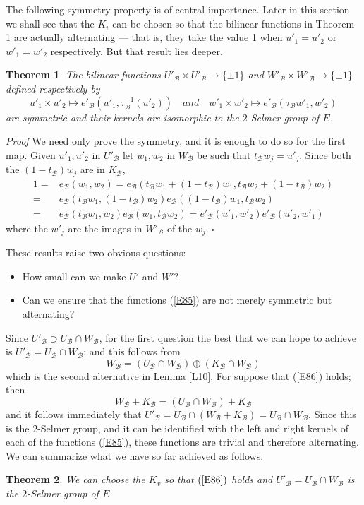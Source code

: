 \documentclass[12pt]{article}
\def\sB{{\mathcal B}}
\def\qed{{\hfill$\square$}}
\def\beq{\begin{equation} \label}
\def\bth{\begin{theorem} \label}
\def\eth{\end{theorem}}
\newtheorem{theorem}{Theorem}
\begin{document}
The following symmetry property is of central importance.
Later in this section we shall see that the $K_i$ can be
chosen so that the bilinear functions in Theorem \ref{T6} are
actually alternating --- that is, they take the value 1
when $u'_1=u'_2$ or $w'_1=w'_2$ respectively. But that result
lies deeper.
\bth{T6} The bilinear functions $U'_\sB\times U'_\sB\rightarrow\{\pm1\}$ and
$W'_\sB\times W'_\sB\rightarrow\{\pm1\}$ defined respectively by
\beq{E85} u'_1\times u'_2\mapsto e'_\sB(u'_1,
\tau^{-1}_\sB(u'_2)) \quad
{\mathit{and}} \quad w'_1\times w'_2\mapsto
e'_\sB(\tau_\sB w'_1,w'_2) \end{equation}
are symmetric and their kernels are isomorphic to the $2$-Selmer group of $E$.
\eth
\emph{Proof} We need only prove the symmetry, and it is enough to do so for
the first map. Given $u'_1,u'_2$ in $U'_\sB$ let $w_1,w_2$ in $W_\sB$ be such
that $t_\sB w_j=u'_j$. Since both the $(1-t_\sB)w_j$ are in $K_\sB$,
\begin{align*}
1= & e_\sB(w_1,w_2)=e_\sB(t_\sB w_1+(1-t_\sB)w_1,t_\sB w_2+(1-t_\sB)w_2) \\
 = & e_\sB(t_\sB w_1,(1-t_\sB)w_2)e_\sB((1-t_\sB)w_1,t_\sB w_2) \\
 = & e_\sB(t_\sB w_1,w_2)e_\sB(w_1,t_\sB w_2)=e'_\sB(u'_1,w'_2)e'_\sB(u'_2,
w'_1)
\end{align*}
where the $w'_j$ are the images in $W'_\sB$ of the $w_j$.  \qed

\medskip

These results raise two obvious questions:
\begin{itemize}
\item How small can we make $U'$ and $W'$?
\item Can we ensure that the functions (\ref{E85}) are not
merely symmetric but alternating?
\end{itemize}
Since $U'_\sB\supset U_\sB\cap W_\sB$, for the first question
the best that we can hope to achieve is
$U'_\sB=U_\sB\cap W_\sB$; and this follows from
\beq{E86} W_\sB=(U_\sB\cap W_\sB)\oplus(K_\sB\cap W_\sB)
\end{equation}
which is the second alternative in Lemma \ref{L10}. For
suppose that (\ref{E86}) holds; then
\[ W_\sB+K_\sB=(U_\sB\cap W_\sB)+K_\sB \]
and it follows immediately that $U'_\sB=U_\sB\cap(W_\sB+K_\sB)
=U_\sB\cap W_\sB$. Since this is the 2-Selmer group, and it
can be identified with the left and right kernels of each of
the functions (\ref{E85}), these functions are trivial and
therefore alternating. We can summarize what we have so far
achieved as follows.
\bth{T11} We can choose the $K_v$ so that $(\ref{E86})$ holds
and $U'_\sB=U_\sB\cap W_\sB$ is the $2$-Selmer group of $E$.
\eth
\end{document}
